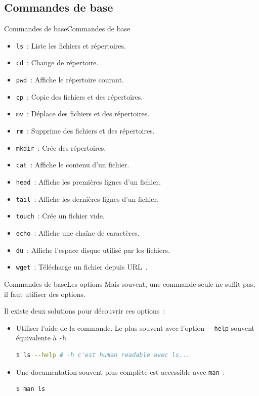 \documentclass{beamer}
\begin{document}
    \subsection{Commandes de base}\label{subsec:commandes-de-base}

    \begin{frame}{Commandes de base}{Commandes de base}
        \begin{itemize}
            \item \lstinline{ls}~: Liste les fichiers et répertoires.
            \item \lstinline{cd}~: Change de répertoire.
            \item \lstinline{pwd}~: Affiche le répertoire courant.
            \item \lstinline{cp}~: Copie des fichiers et des répertoires.
            \item \lstinline{mv}~: Déplace des fichiers et des répertoires.
            \item \lstinline{rm}~: Supprime des fichiers et des répertoires.
            \item \lstinline{mkdir}~: Crée des répertoires.
            \item \lstinline{cat}~: Affiche le contenu d'un fichier.
            \item \lstinline{head}~: Affiche les premières lignes d'un fichier.
            \item \lstinline{tail}~: Affiche les dernières lignes d'un fichier.
            \item \lstinline{touch}~: Crée un fichier vide.
            \item \lstinline{echo}~: Affiche une chaîne de caractères.
            \item \lstinline{du}~: Affiche l'espace disque utilisé par les fichiers.
            \item \lstinline{wget}~: Télécharge un fichier depuis URL~.
        \end{itemize}
    \end{frame}

    \begin{frame}[fragile]{Commandes de base}{Les options}
        Mais souvent, une commande seule ne suffit pas, il faut utiliser des options.

        Il existe deux solutions pour découvrir ces options~:
        \begin{itemize}
            \item Utiliser l'aide de la commande.
            Le plus souvent avec l'option \lstinline{--help} souvent équivalente à \lstinline{-h}.
            \begin{lstlisting}[language=bash]
$ ls --help # -h c'est human readable avec ls...
            \end{lstlisting}
            \item Une documentation souvent plus complète est accessible avec \lstinline{man}~:
            \begin{lstlisting}[language=bash]
$ man ls
            \end{lstlisting}
        \end{itemize}
    \end{frame}
\end{document}
